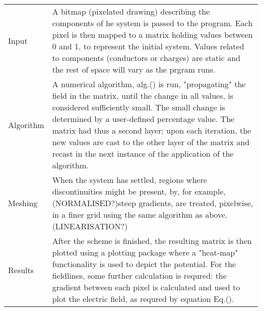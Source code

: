 \documentclass{article}
\begin{document}
  \begin{tabular}{ l p{10cm} }
	Input		&	A bitmap (pixelated drawing) describing the components of he system is passed to the program. 
				 Each pixel is then mapped to a matrix holding values between 0 and 1, to represent the 
				  initial system. 
				 Values related to components (conductors or charges) are static and the rest of space will 
				  vary as the prgram runs.\\
	Algorithm	&	A numerical algorithm, alg.() is run, "propagating" the field in the matrix, until 
				  the change in all values, is considered sufficiently small. 
				 The small change is determined by a user-defined percentage value. 
				 The matrix had thus a second layer; upon each iteration, the new values are cast
				  to the other layer of the matrix and recast in the next instance of the application 
				  of the algorithm.\\
 	Meshing		&	When the system has settled, regions where discontinuities might be present, by, 
 				  for example, (NORMALISED?)steep gradients, are treated, pixelwise, in a finer grid
 				  using the same algorithm as above. (LINEARISATION?) \\
	Results		&	After the scheme is finished, the resulting matrix is then plotted using a plotting 
				  package where a "heat-map" functionality is used to depict the potential. 
				 For the fieldlines, some further calculation is requred: the gradient between 
				  each pixel is calculated and used to plot the electric field, as requred by equation 
				  Eq.().
  \end{tabular}
\end{document}

